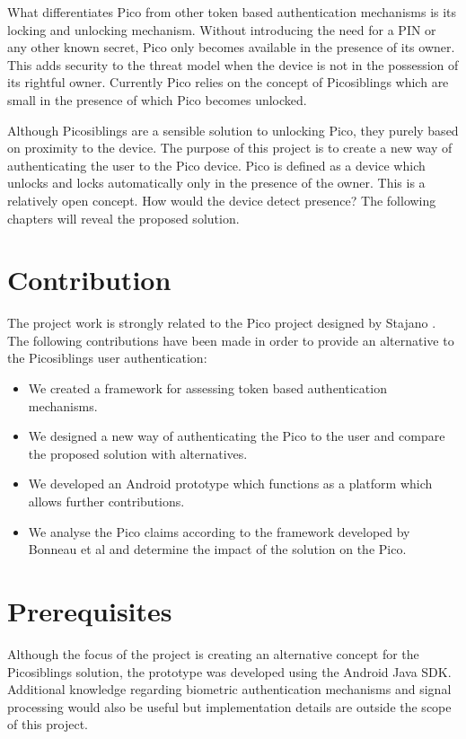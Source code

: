 What differentiates Pico from other token based authentication mechanisms is its locking and unlocking mechanism. Without introducing the need for a PIN or any other known secret, Pico only becomes available in the presence of its owner. This adds security to the threat model when the device is not in the possession of its rightful owner. Currently Pico relies on the concept of Picosiblings \cite{stannard2012good} which are small in the presence of which Pico becomes unlocked.

Although Picosiblings are a sensible solution to unlocking Pico, they purely based on proximity to the device. The purpose of this project is to create a new way of authenticating the user to the Pico device. Pico is defined as a device which unlocks and locks automatically only in the presence of the owner. This is a relatively open concept. How would the device detect presence? The following chapters will reveal the proposed solution.

\section{Contribution}
The project work is strongly related to the Pico project designed by Stajano \cite{stajano2011pico}. The following contributions have been made in order to provide an alternative to the Picosiblings user authentication:

\begin{itemize}
	\item We created a framework for assessing token based authentication mechanisms.
	\item We designed a new way of authenticating the Pico to the user and compare the proposed solution with alternatives.
	\item We developed an Android prototype which functions as a platform which allows further contributions.
	\item We analyse the Pico claims according to the framework developed by Bonneau et al \cite{bonneau2012quest} and determine the impact of the solution on the Pico.
\end{itemize}	

\section{Prerequisites}
Although the focus of the project is creating an alternative concept for the Picosiblings solution, the prototype was developed using the Android Java SDK. Additional knowledge regarding biometric authentication mechanisms and signal processing would also be useful but implementation details are outside the scope of this project.